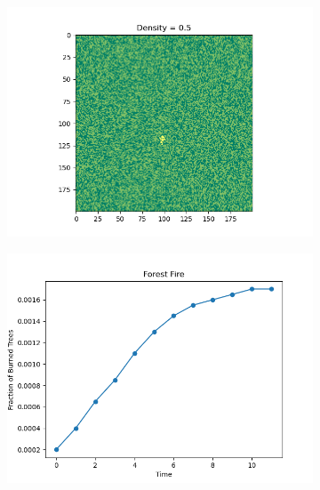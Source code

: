 \documentclass{article}
\begin{document}
    \begin{figure}[H]
        \centering
        \begin{subfigure}[b]{0.49\linewidth}
         \centering
         \includegraphics[width=\linewidth]{../images/forestfire_single05image}
     \end{subfigure}
        \hfill
        \begin{subfigure}[b]{0.49\linewidth}
         \centering
         \includegraphics[width=\linewidth]{../images/forestfire_single05}
     \end{subfigure}
     \hfill
     \begin{subfigure}[b]{0.49\linewidth}
         \centering

\end{subfigure}
\end{figure}
\end{document}
